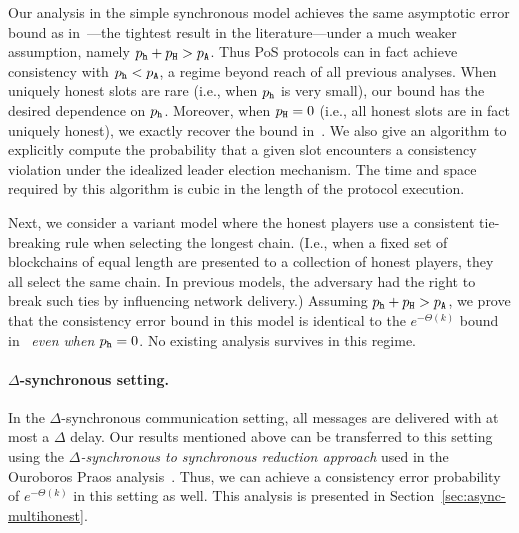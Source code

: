 Our analysis in the simple synchronous model achieves the same
asymptotic error bound as in~\cite{LinearConsistencySODA}---the
tightest result in the literature---under a much weaker assumption,
namely $p_{\mathtt{h}} + p_{\mathtt{H}} > p_{\mathtt{A}}$.  Thus PoS protocols can in fact achieve
consistency with $p_{\mathtt{h}} < p_{\mathtt{A}}$, a regime beyond reach of all previous analyses. 
When uniquely honest slots are rare 
(i.e., when $p_{\mathtt{h}}$ is very small), 
our bound has the desired dependence on $p_{\mathtt{h}}$. 
Moreover, when $p_{\mathtt{H}} = 0$ (i.e., all honest slots are in fact
uniquely honest), we exactly recover the bound
in~\cite{LinearConsistencySODA}. 
We also give an algorithm to explicitly compute the probability 
that a given slot encounters a consistency violation 
under the idealized leader election mechanism. 
The time and space required by this algorithm is cubic 
in the length of the protocol execution.

Next, we consider a variant model where the honest players use a
consistent tie-breaking rule when selecting the longest chain.  (I.e.,
when a fixed set of blockchains of equal length are presented to a
collection of honest players, they all select the same chain.
In previous models, the adversary had the right to break such ties by influencing
network delivery.)
Assuming $p_{\mathtt{h}} + p_{\mathtt{H}} > p_{\mathtt{A}}$, we prove that the consistency error
bound in this model is identical to the $e^{-\Theta(k)}$ bound
in~\cite{LinearConsistencySODA} \emph{even when $p_{\mathtt{h}} =
  0$}. No existing analysis survives in this regime.


\paragraph{$\Delta$-synchronous setting.}
In the $\Delta$-synchronous
communication setting, all messages are delivered with at most
a $\Delta$ delay. Our results mentioned above can be transferred to
this setting using the \emph{$\Delta$-synchronous to synchronous reduction
approach} used in the Ouroboros Praos analysis~\cite{Praos}. Thus, we
can achieve a consistency error probability of $e^{-\Theta(k)}$ in this
setting as well. 
This analysis is presented in 
Section~\ref{sec:async-multihonest}.

